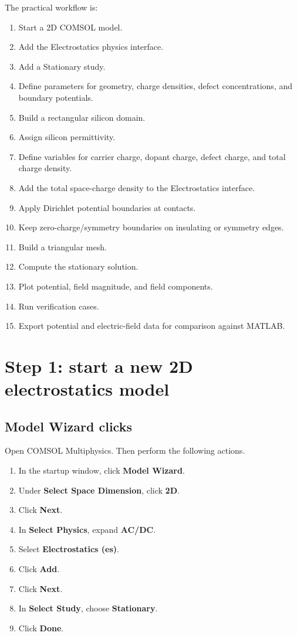 \documentclass[11pt]{article}
\begin{document}
The practical workflow is:
\begin{enumerate}[leftmargin=2em]
\item Start a 2D COMSOL model.
\item Add the Electrostatics physics interface.
\item Add a Stationary study.
\item Define parameters for geometry, charge densities, defect concentrations, and boundary potentials.
\item Build a rectangular silicon domain.
\item Assign silicon permittivity.
\item Define variables for carrier charge, dopant charge, defect charge, and total charge density.
\item Add the total space-charge density to the Electrostatics interface.
\item Apply Dirichlet potential boundaries at contacts.
\item Keep zero-charge/symmetry boundaries on insulating or symmetry edges.
\item Build a triangular mesh.
\item Compute the stationary solution.
\item Plot potential, field magnitude, and field components.
\item Run verification cases.
\item Export potential and electric-field data for comparison against MATLAB.
\end{enumerate}

\section{Step 1: start a new 2D electrostatics model}

\subsection{Model Wizard clicks}

Open COMSOL Multiphysics. Then perform the following actions.

\begin{enumerate}[leftmargin=2em]
\item In the startup window, click \textbf{Model Wizard}.
\item Under \textbf{Select Space Dimension}, click \textbf{2D}.
\item Click \textbf{Next}.
\item In \textbf{Select Physics}, expand \textbf{AC/DC}.
\item Select \textbf{Electrostatics (es)}.
\item Click \textbf{Add}.
\item Click \textbf{Next}.
\item In \textbf{Select Study}, choose \textbf{Stationary}.
\item Click \textbf{Done}.
\end{enumerate}
\end{document}
